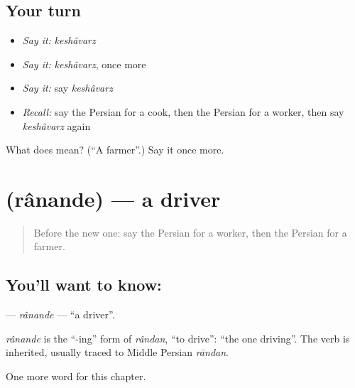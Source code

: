 \subsection*{Your turn}
\begin{itemize}
\raggedright
  \item \emph{Say it:} \emph{keshâvarz}
  \item \emph{Say it:} \emph{keshâvarz}, once more
  \item \emph{Say it:} say \emph{keshâvarz}
  \item \emph{Recall:} say the Persian for a cook, then the Persian for a worker, then say \emph{keshâvarz} again
\end{itemize}

\begin{tcolorbox}[breakable,colback=teal!4,colframe=teal!35!black,title={Before you move on}]
What does  mean? (\textquotedblleft{}A farmer\textquotedblright{}.) Say it once more.
\end{tcolorbox}
\section[\texorpdfstring{\fa{راننده} (rânande)}{راننده (rânande)}]{ (rânande) — a driver}

\label{lesson:FA-C116-ranande}



\begin{quote}
Before the new one: say the Persian for a worker, then the Persian for a farmer.
\end{quote}

\subsection*{You'll want to know: }
\textbf{} — \emph{rânande} — \textquotedblleft{}a driver\textquotedblright{}.

\begin{cousinweb}
\emph{rânande} is the \textquotedblleft{}-ing\textquotedblright{} form of \emph{rândan}, \textquotedblleft{}to drive\textquotedblright{}: \textquotedblleft{}the one driving\textquotedblright{}. The verb is inherited, usually traced to Middle Persian \emph{rāndan}.
\end{cousinweb}

\begin{grammarlens}[title={What you've built}]
One more word for this chapter.
\end{grammarlens}

